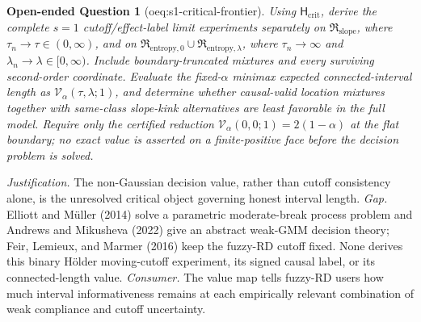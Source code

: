\documentclass{article}
\newtheorem{openendedquestion}{Open-ended Question}
\begin{document}
\begin{openendedquestion}[oeq:s1-critical-frontier]\label{oeq:s1-critical-frontier}
Using \(\mathsf H_{\mathrm{crit}}\), derive the complete \(s=1\) cutoff/effect-label limit experiments separately on \(\mathfrak R_{\mathrm{slope}}\), where \(\tau_n\to\tau\in(0,\infty)\), and on \(\mathfrak R_{\mathrm{entropy},0}\cup\mathfrak R_{\mathrm{entropy},\lambda}\), where \(\tau_n\to\infty\) and \(\lambda_n\to\lambda\in[0,\infty)\). Include boundary-truncated mixtures and every surviving second-order coordinate. Evaluate the fixed-\(\alpha\) minimax expected connected-interval length as \(\mathcal V_\alpha(\tau,\lambda;1)\), and determine whether causal-valid location mixtures together with same-class slope-kink alternatives are least favorable in the full model. Require only the certified reduction \(\mathcal V_\alpha(0,0;1)=2(1-\alpha)\) at the flat boundary; no exact value is asserted on a finite-positive face before the decision problem is solved.
\end{openendedquestion}
\par\smallskip\noindent \textit{Justification.} The non-Gaussian decision value, rather than cutoff consistency alone, is the unresolved critical object governing honest interval length. \textit{Gap.} Elliott and M\"uller (2014) solve a parametric moderate-break process problem and Andrews and Mikusheva (2022) give an abstract weak-GMM decision theory; Feir, Lemieux, and Marmer (2016) keep the fuzzy-RD cutoff fixed. None derives this binary H\"older moving-cutoff experiment, its signed causal label, or its connected-length value. \textit{Consumer.} The value map tells fuzzy-RD users how much interval informativeness remains at each empirically relevant combination of weak compliance and cutoff uncertainty.
\end{document}
